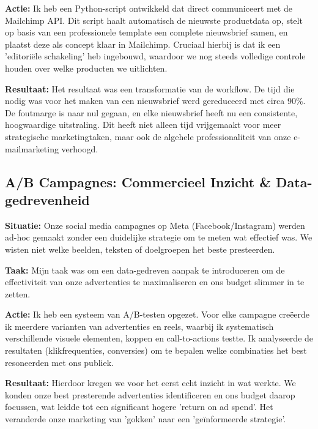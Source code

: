 \documentclass[11pt,a4paper]{article}
\begin{document}
\textbf{\color{accentgray}Actie:} Ik heb een Python-script ontwikkeld dat direct communiceert met de Mailchimp API. Dit script haalt automatisch de nieuwste productdata op, stelt op basis van een professionele template een complete nieuwsbrief samen, en plaatst deze als concept klaar in Mailchimp. Cruciaal hierbij is dat ik een 'editoriële schakeling' heb ingebouwd, waardoor we nog steeds volledige controle houden over welke producten we uitlichten.

\textbf{\color{accentgray}Resultaat:} Het resultaat was een transformatie van de workflow. De tijd die nodig was voor het maken van een nieuwsbrief werd gereduceerd met circa 90\%. De foutmarge is naar nul gegaan, en elke nieuwsbrief heeft nu een consistente, hoogwaardige uitstraling. Dit heeft niet alleen tijd vrijgemaakt voor meer strategische marketingtaken, maar ook de algehele professionaliteit van onze e-mailmarketing verhoogd.

\vspace{1em}

\subsection{A/B Campagnes: Commercieel Inzicht \& Data-gedrevenheid}

\textbf{\color{accentgray}Situatie:} Onze social media campagnes op Meta (Facebook/Instagram) werden ad-hoc gemaakt zonder een duidelijke strategie om te meten wat effectief was. We wisten niet welke beelden, teksten of doelgroepen het beste presteerden.

\textbf{\color{accentgray}Taak:} Mijn taak was om een data-gedreven aanpak te introduceren om de effectiviteit van onze advertenties te maximaliseren en ons budget slimmer in te zetten.

\textbf{\color{accentgray}Actie:} Ik heb een systeem van A/B-testen opgezet. Voor elke campagne creëerde ik meerdere varianten van advertenties en reels, waarbij ik systematisch verschillende visuele elementen, koppen en call-to-actions testte. Ik analyseerde de resultaten (klikfrequenties, conversies) om te bepalen welke combinaties het best resoneerden met ons publiek.

\textbf{\color{accentgray}Resultaat:} Hierdoor kregen we voor het eerst echt inzicht in wat werkte. We konden onze best presterende advertenties identificeren en ons budget daarop focussen, wat leidde tot een significant hogere 'return on ad spend'. Het veranderde onze marketing van 'gokken' naar een 'geïnformeerde strategie'.
\end{document}
